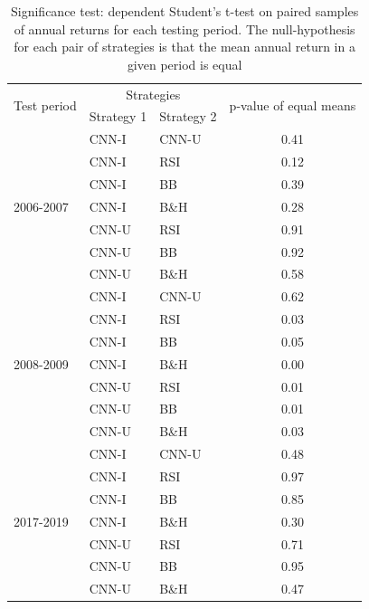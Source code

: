 \documentclass[12pt, a4paper]{article}
\begin{document}
\begin{table}[H]
\centering
\begin{tabular}{l|l|l|c}
\multicolumn{1}{m{1cm}|}{\multirow{2}{1cm}{Test period}}  & \multicolumn{2}{c|}{Strategies}  & \multicolumn{1}{m{2cm}}{\multirow{2}{2cm}{p-value of equal means}} \\ \cline{2-3}
             & Strategy 1 & Strategy 2 &         \\ \hline \hline
\multirow{7}{1cm}{2006-2007}  & CNN-I      & CNN-U      & 0.41    \\
             & CNN-I      & RSI        & 0.12    \\
             & CNN-I      & BB         & 0.39    \\
             & CNN-I      & B\&H       & 0.28    \\
             & CNN-U      & RSI        & 0.91    \\
             & CNN-U      & BB         & 0.92    \\
             & CNN-U      & B\&H       & 0.58    \\ \hline
\multirow{7}{1cm}{2008-2009} & CNN-I      & CNN-U      & 0.62    \\
             & CNN-I      & RSI        & 0.03    \\
             & CNN-I      & BB         & 0.05    \\
             & CNN-I      & B\&H       & 0.00    \\
             & CNN-U      & RSI        & 0.01    \\
             & CNN-U      & BB         & 0.01    \\
             & CNN-U      & B\&H       & 0.03    \\ \hline
\multirow{7}{1cm}{2017-2019}  & CNN-I      & CNN-U      & 0.48    \\
             & CNN-I      & RSI        & 0.97    \\
             & CNN-I      & BB         & 0.85    \\
             & CNN-I      & B\&H       & 0.30    \\
             & CNN-U      & RSI        & 0.71    \\
             & CNN-U      & BB         & 0.95    \\
             & CNN-U      & B\&H       & 0.47   
\end{tabular}
\caption{Significance test: dependent Student’s t-test on paired samples of annual returns for each testing period. The null-hypothesis for each pair of strategies is that the mean annual return in a given period is equal}
\label{tbl:AnnRes_Signf}
\end{table}
\end{document}
